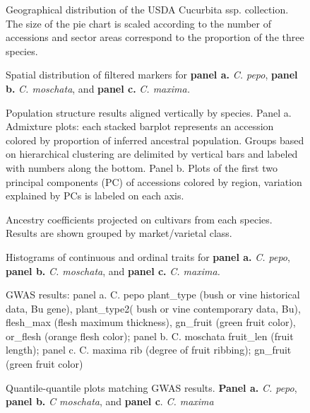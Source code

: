 \documentclass[utf8]{FrontiersinHarvard} %
\begin{document}
\begin{figure}[h]
\caption{Geographical distribution of the USDA Cucurbita ssp. collection. The size of the pie chart is scaled according to the number of accessions and sector areas correspond to the proportion of the three species. \label{fig:2}}
\end{figure}

\begin{figure}[h]
\caption{Spatial distribution of filtered markers for \textbf{panel a.} \textit{C. pepo}, \textbf{panel b.} \textit{C. moschata}, and \textbf{panel c.} \textit{C. maxima.} \label{fig:3}}
\end{figure}

\begin{figure}[h]
	\caption{Population structure results aligned vertically by species. Panel a. Admixture plots: each stacked barplot represents an accession colored by proportion of inferred ancestral population. Groups based on hierarchical clustering are delimited by vertical bars and labeled with numbers along the bottom. Panel b. Plots of the first two principal components (PC) of accessions colored by region, variation explained by PCs is labeled on each axis. \label{fig:4}}
\end{figure}


\begin{figure}[h]
	\caption{Ancestry coefficients projected on cultivars from each species. Results are shown grouped by market/varietal class. \label{fig:5}}
\end{figure}

\begin{figure}[h]
	\caption{Histograms of continuous and ordinal traits for \textbf{panel a.} \textit{C. pepo}, \textbf{panel b.} \textit{C. moschata}, and \textbf{panel c.} \textit{C. maxima.}\label{fig:6}}
\end{figure}

\begin{figure}[h]
	\caption{GWAS results: panel a. C. pepo plant\_type (bush or vine historical data, Bu gene), plant\_type2( bush or vine contemporary data, Bu), flesh\_max (flesh maximum thickness), gn\_fruit (green fruit color), or\_flesh (orange flesh color); panel b. C. moschata fruit\_len (fruit length); panel c. C. maxima rib (degree of fruit ribbing); gn\_fruit (green fruit color) \label{fig:7}}
\end{figure}

\begin{figure}[h]
	\caption{Quantile-quantile plots matching GWAS results. \textbf{Panel a.} \textit{C. pepo}, \textbf{panel b.} \textit{C moschata}, and \textbf{panel c}. \textit{C. maxima} \label{fig:8}}
\end{figure}
\end{document}
